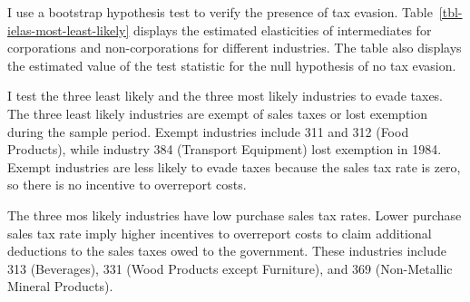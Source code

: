 \documentclass[
  12pt]{article}
\theoremstyle{definition}
\theoremstyle{remark}
\begin{document}
I use a bootstrap hypothesis test to verify the presence of tax evasion.
Table~\ref{tbl-ielas-most-least-likely} displays the estimated
elasticities of intermediates for corporations and non-corporations for
different industries. The table also displays the estimated value of the
test statistic for the null hypothesis of no tax evasion.

I test the three least likely and the three most likely industries to
evade taxes. The three least likely industries are exempt of sales taxes
or lost exemption during the sample period. Exempt industries include
311 and 312 (Food Products), while industry 384 (Transport Equipment)
lost exemption in 1984. Exempt industries are less likely to evade taxes
because the sales tax rate is zero, so there is no incentive to
overreport costs.

The three mos likely industries have low purchase sales tax rates. Lower
purchase sales tax rate imply higher incentives to overreport costs to
claim additional deductions to the sales taxes owed to the government.
These industries include 313 (Beverages), 331 (Wood Products except
Furniture), and 369 (Non-Metallic Mineral Products).
\end{document}
